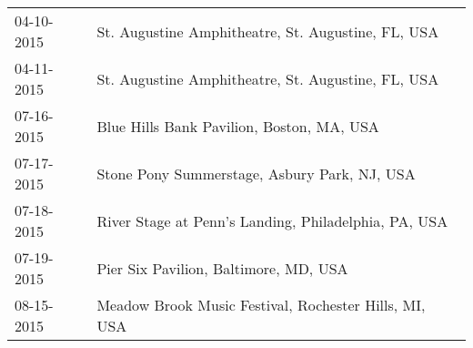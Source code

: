 \begin{supertabular}{ll}
 04-10-2015 &     St. Augustine Amphitheatre, St. Augustine, FL, USA \\
 04-11-2015 &     St. Augustine Amphitheatre, St. Augustine, FL, USA \\
 07-16-2015 &              Blue Hills Bank Pavilion, Boston, MA, USA \\
 07-17-2015 &           Stone Pony Summerstage, Asbury Park, NJ, USA \\
 07-18-2015 &   River Stage at Penn's Landing, Philadelphia, PA, USA \\
 07-19-2015 &                  Pier Six Pavilion, Baltimore, MD, USA \\
 08-15-2015 &  Meadow Brook Music Festival, Rochester Hills, MI, USA \\
\end{supertabular}
